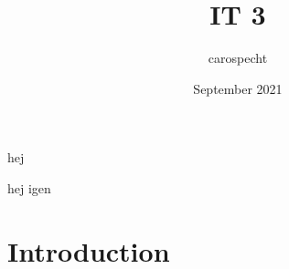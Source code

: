 \documentclass{article}
\title{IT 3}
\author{carospecht }
\date{September 2021}
\begin{document}
hej

hej igen

\maketitle

\section{Introduction}
\end{document}
